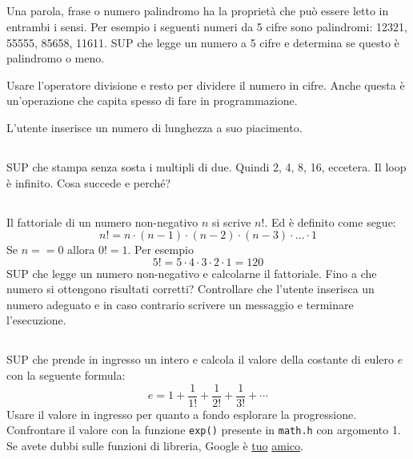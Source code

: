 \documentclass{article}
\begin{document}
\subsection{}
Una parola, frase o numero palindromo ha la proprietà che può essere letto in entrambi i sensi. Per esempio i seguenti numeri da 5 cifre sono palindromi: 12321, 55555, 85658, 11611. SUP che legge un numero a 5 cifre e determina se questo è palindromo o meno.
\begin{info} 
	Usare l'operatore divisione e resto per dividere il numero in cifre. Anche questa è un'operazione che capita spesso di fare in programmazione.
\end{info}
\vspace{-10pt}
\begin{warn}
	L'utente inserisce un numero di lunghezza a suo piacimento. 
\end{warn}

\subsection{}
SUP che stampa senza sosta i multipli di due. Quindi 2, 4, 8, 16, eccetera. Il loop è infinito. Cosa succede e perché?

\subsection{}
Il fattoriale di un numero non-negativo $n$ si scrive $n!$. Ed è definito come segue:
$$n! = n \cdot (n - 1) \cdot (n - 2) \cdot (n - 3) \cdot \ldots \cdot 1$$
Se $n==0$ allora $0! = 1$.
Per esempio $$5! = 5 \cdot 4 \cdot 3 \cdot 2 \cdot 1 = 120$$
SUP che legge un numero non-negativo e calcolarne il fattoriale. Fino a che numero si ottengono risultati corretti? Controllare che l'utente inserisca un numero adeguato e in caso contrario scrivere un messaggio e terminare l'esecuzione. 

\subsection{}
SUP che prende in ingresso un intero e calcola il valore della costante di eulero $e$ con la seguente formula:
$$e = 1 + \frac{1}{1!} + \frac{1}{2!} + \frac{1}{3!} + \cdots$$
Usare il valore in ingresso per quanto a fondo esplorare la progressione. Confrontare il valore con la funzione \texttt{exp()} presente in \texttt{math.h} con argomento 1. Se avete dubbi sulle funzioni di libreria, Google è \href{http://www.cplusplus.com/reference/cmath/exp/}{tuo} \href{https://www.geeksforgeeks.org/exp-function-cpp/}{amico}.
\end{document}

